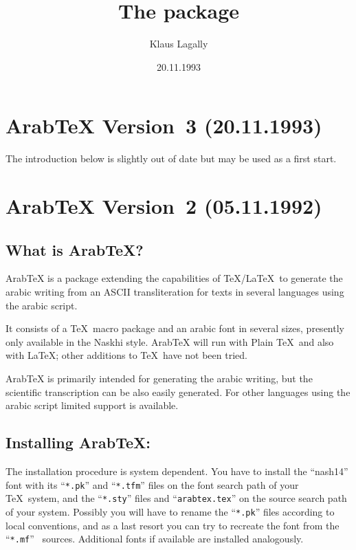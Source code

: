 \documentclass[pagesize=auto]{scrartcl}
\title{The \ArabTeX package}
\author{Klaus Lagally}
\date{20.11.1993}
\makeatletter
\newcommand*{\ArabTeX}{Arab\kern-0.12em\TeX\@\xspace}
\def\ArabTeX{ArabTeX\xspace}%
\makeatother
\begin{document}
\maketitle

\tableofcontents

\section{\ArabTeX Version~3 (20.11.1993)}

The introduction below is slightly out of date 
but may be used as a first start.


\section{\ArabTeX Version~2 (05.11.1992)}

\subsection{What is \ArabTeX?}

\ArabTeX is a package extending the capabilities of \TeX/\LaTeX\ to generate 
the arabic writing from an ASCII transliteration for texts in several 
languages using the arabic script. 

It consists of a \TeX\ macro package and an arabic font in several sizes,         
presently only available in the Naskhi style. \ArabTeX will run with Plain 
\TeX\ and also with \LaTeX; other additions to \TeX\ have not been tried. 

\ArabTeX is primarily intended for generating the arabic writing, but the 
scientific transcription can be also easily generated. For other languages 
using the arabic script limited support is available. 


\subsection{Installing \ArabTeX:}

The installation procedure is system dependent. You have to install the 
``\textsf{nash14}'' font with its ``\texttt{*.pk}'' and ``\texttt{*.tfm}'' files on the font search path of 
your \TeX\ system, and the ``\texttt{*.sty}'' files and ``\texttt{arabtex.tex}'' on the source 
search path of your system. Possibly you will have to rename the ``\texttt{*.pk}'' 
files according to local conventions, and as a last resort you can try to 
recreate the font from the ``\texttt{*.mf}'' \MF\ sources. Additional fonts if 
available are installed analogously.
\end{document}
